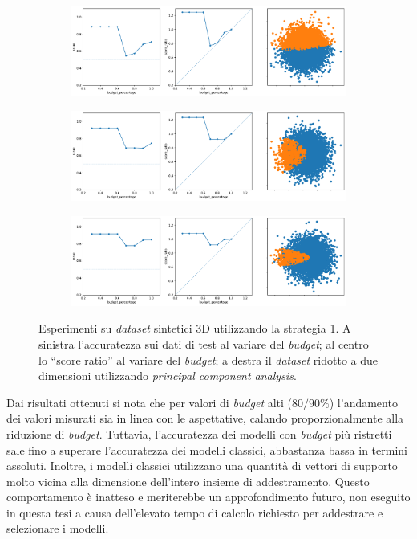 \begin{figure}
    \begin{subfigure}{\textwidth}
        \centering
        \includegraphics[width=\textwidth]{img/3d/1.pdf}
    \end{subfigure}%
    \hfill
    \begin{subfigure}{\textwidth}
        \centering
        \includegraphics[width=\textwidth]{img/3d/2.pdf}
    \end{subfigure}%
    \hfill
    \begin{subfigure}{\textwidth}
        \centering
        \includegraphics[width=\textwidth]{img/3d/3.pdf}
    \end{subfigure}%
\caption{Esperimenti su \emph{dataset} sintetici 3D utilizzando la strategia 1. A sinistra l'accuratezza sui dati di test al variare del \emph{budget}; al centro lo ``score ratio'' al variare del \emph{budget}; a destra il \emph{dataset} ridotto a due dimensioni utilizzando \emph{principal component analysis}.}
\label{fig:3d_exp}
\end{figure}
Dai risultati ottenuti si nota che per valori di \emph{budget} alti ($80/90\%$) l'andamento dei valori misurati sia in linea con le aspettative, calando proporzionalmente alla riduzione di \emph{budget}.
Tuttavia, l'accuratezza dei modelli con \emph{budget} più ristretti sale fino a superare l'accuratezza dei modelli classici, abbastanza bassa in termini assoluti.
Inoltre, i modelli classici utilizzano una quantità di vettori di supporto molto vicina alla dimensione dell'intero insieme di addestramento.
Questo comportamento è inatteso e meriterebbe un approfondimento futuro, non eseguito in questa tesi a causa dell'elevato tempo di calcolo richiesto per addestrare e selezionare i modelli.


